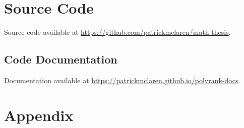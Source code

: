\documentclass{amsart}
\theoremstyle{definition}
\theoremstyle{remark}
\numberwithin{equation}{section}
\begin{document}
%

\section{Source Code}

Source code available at \url{https://github.com/patrickmclaren/math-thesis}.

\subsection{Code Documentation}

Documentation available at \url{https://patrickmclaren.github.io/polyrank-docs}.

\newpage

\section{Appendix}



\newpage

\printbibliography
\end{document}
